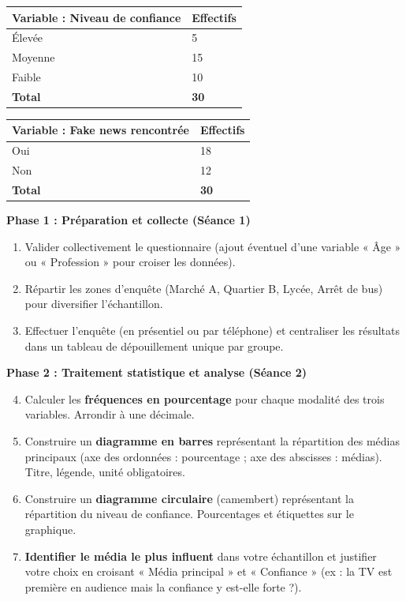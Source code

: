 \documentclass[11pt]{article}
\newcounter{popsec}
\newcounter{popsub}
\newcommand{\courssub}[1]{%
  \stepcounter{popsub}%
  \par\vspace{9pt}\noindent{\popxbold\fontsize{11.5}{13}\selectfont\color{popink}{\color{poporange}\thepopsec.\thepopsub}\hspace{6pt}#1}\par\nopagebreak\vspace{4pt}
}
\begin{document}
\begin{center}
\begin{tabularx}{\linewidth}{|l|X|}\hline
\textbf{Variable : Niveau de confiance} & \textbf{Effectifs} \\ \hline
Élevée & 5 \\ \hline
Moyenne & 15 \\ \hline
Faible & 10 \\ \hline
\textbf{Total} & \textbf{30} \\ \hline
\end{tabularx}
\end{center}

\begin{center}
\begin{tabularx}{\linewidth}{|l|X|}\hline
\textbf{Variable : Fake news rencontrée} & \textbf{Effectifs} \\ \hline
Oui & 18 \\ \hline
Non & 12 \\ \hline
\textbf{Total} & \textbf{30} \\ \hline
\end{tabularx}
\end{center}

\courssub{Consignes}
\textbf{Phase 1 : Préparation et collecte (Séance 1)}
\begin{enumerate}
    \item Valider collectivement le questionnaire (ajout éventuel d'une variable « Âge » ou « Profession » pour croiser les données).
    \item Répartir les zones d'enquête (Marché A, Quartier B, Lycée, Arrêt de bus) pour diversifier l'échantillon.
    \item Effectuer l'enquête (en présentiel ou par téléphone) et centraliser les résultats dans un tableau de dépouillement unique par groupe.
\end{enumerate}

\textbf{Phase 2 : Traitement statistique et analyse (Séance 2)}
\begin{enumerate}
    \setcounter{enumi}{3}
    \item Calculer les \textbf{fréquences en pourcentage} pour chaque modalité des trois variables. Arrondir à une décimale.
    \item Construire un \textbf{diagramme en barres} représentant la répartition des médias principaux (axe des ordonnées : pourcentage ; axe des abscisses : médias). Titre, légende, unité obligatoires.
    \item Construire un \textbf{diagramme circulaire} (camembert) représentant la répartition du niveau de confiance. Pourcentages et étiquettes sur le graphique.
    \item \textbf{Identifier le média le plus influent} dans votre échantillon et justifier votre choix en croisant « Média principal » et « Confiance » (ex : la TV est première en audience mais la confiance y est-elle forte ?).
\end{enumerate}
\end{document}
